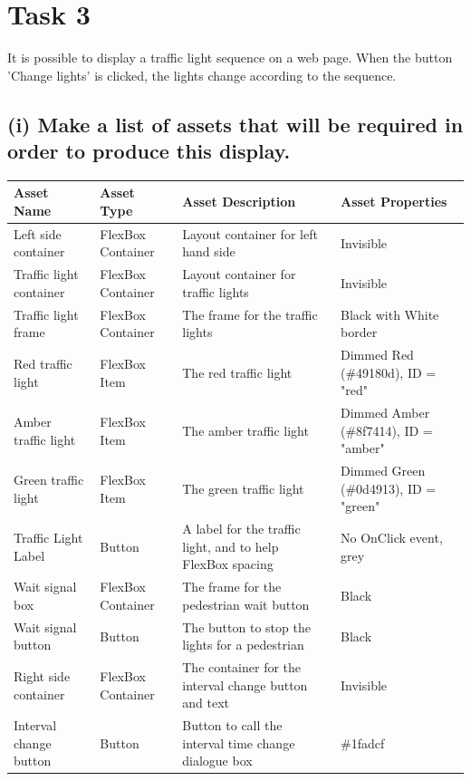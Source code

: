 \documentclass[a4paper]{article}
\begin{document}

\section{Task 3}
It is possible to display a traffic light sequence on a web page. When the button 'Change lights' is
clicked, the lights change according to the sequence.
\subsection{(i) Make a list of assets that will be required in order to produce this display.}
\begin{center}
\begin{tabular}{ | m{9em} | m{10em} | m{15em} | m{8em} | }
  \hline
  Asset Name & Asset Type & Asset Description & Asset Properties	\\ [0.5ex] 
  \hline \hline	
  Left side container & FlexBox Container & Layout container for left hand side & Invisible \\
  \hline
  Traffic light container & FlexBox Container & Layout container for traffic lights & Invisible \\
  \hline
  Traffic light frame & FlexBox Container & The frame for the traffic lights & Black with White border \\
  \hline
  Red traffic light & FlexBox Item & The red traffic light & Dimmed Red (\#49180d), ID = "red" \\
  \hline
  Amber traffic light & FlexBox Item & The amber traffic light & Dimmed Amber (\#8f7414), ID = "amber" \\
	\hline
	Green traffic light & FlexBox Item & The green traffic light & Dimmed Green (\#0d4913), ID = "green" \\
	\hline
	Traffic Light Label & Button & A label for the traffic light, and to help FlexBox spacing & No OnClick event, grey \\
	\hline
	Wait signal box & FlexBox Container & The frame for the pedestrian wait button & Black \\
	\hline
	Wait signal button & Button & The button to stop the lights for a pedestrian & Black \\
	\hline
	Right side container & FlexBox Container & The container for the interval change button and text & Invisible \\
	\hline
	Interval change button & Button & Button to call the interval time change dialogue box & \#1fadcf \\
	\hline
\end{tabular}
\end{center}
\end{document}
